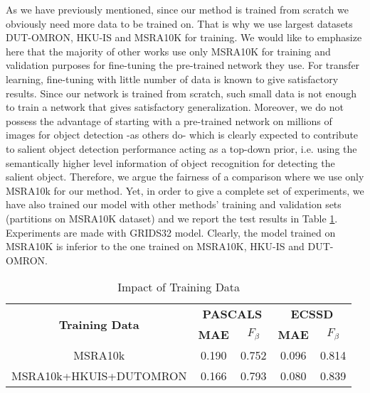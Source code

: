 \documentclass[a4paper,conference]{IEEEtran}
\begin{document}
As we have previously mentioned, since our method is trained from scratch we obviously need more data to be trained on. That is why we use largest datasets DUT-OMRON, HKU-IS and MSRA10K for training.
We would like to emphasize here that the majority of other works use only MSRA10K for training and validation purposes for fine-tuning the pre-trained network they use.
For transfer learning, fine-tuning with little number of data is known to give satisfactory results.
Since our network is trained from scratch, such small data is not enough to train a network that gives satisfactory generalization.
Moreover, we do not possess the advantage of starting with a pre-trained network on millions of images for object detection -as others do- which is clearly expected to contribute to salient object detection performance acting as a top-down prior, i.e. using the semantically higher level information of object recognition for detecting the salient object.
Therefore, we argue the fairness of a comparison where we use only MSRA10k for our method.
Yet, in order to give a complete set of experiments, we have also trained our model with other methods' training and validation sets (partitions on MSRA10K dataset) and we report the test results in Table \ref{table6}.
Experiments are made with GRIDS32 model.
Clearly, the model trained on MSRA10K is inferior to the one trained on MSRA10K, HKU-IS and DUT-OMRON.

\begin{table}[!t]
\renewcommand{\arraystretch}{1.3}
\caption{Impact of Training Data}
\label{table6}
\centering
\begin{tabular}{|c||c||c||c||c|}
\hline
    \multirow{2}{2cm}{\textbf{Training Data}} & \multicolumn{2}{c|}{\textbf{PASCALS}} & \multicolumn{2}{c|}{\textbf{ECSSD}}   \\
    \cline{2-5}
     &\textbf{MAE} & \textbf{$F_\beta$} & \textbf{MAE} & \textbf{$F_\beta$}   \\
    \hline

    MSRA10k & 0.190 & 0.752 & 0.096 & 0.814 \\ \hline
    MSRA10k+HKUIS+DUTOMRON & 0.166 & 0.793 & 0.080 & 0.839   \\ \hline

\end{tabular}
\end{table}
\end{document}
